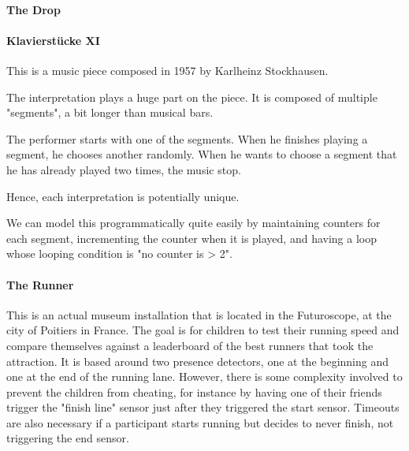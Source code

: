 \documentclass{sigchi}
\begin{document}
\paragraph{The Drop}
\paragraph{Klavierstücke XI}
This is a music piece composed in 1957 by Karlheinz Stockhausen.

The interpretation plays a huge part on the piece. It is composed of multiple "segments", a bit longer than musical bars.

The performer starts with one of the segments. When he finishes playing a segment, he chooses another randomly. When he wants to choose a segment that he has already played two times, the music stop.

Hence,  each interpretation is potentially unique.

We can model this programmatically quite easily by maintaining counters for each segment, incrementing the counter when it is played, and having a loop whose looping condition is "no counter is > 2".

\paragraph{The Runner}
This is an actual museum installation that is located in the Futuroscope, at the city of Poitiers in France. The goal is for children to test their running speed and compare themselves against a leaderboard of the best runners that took the attraction. It is based around two presence detectors, one at the beginning and one at the end of the running lane. However, there is some complexity involved to prevent the children from cheating, for instance by having one of their friends trigger the "finish line" sensor just after they triggered the start sensor. Timeouts are also necessary if a participant starts running but decides to never finish, not triggering the end sensor.
\end{document}
